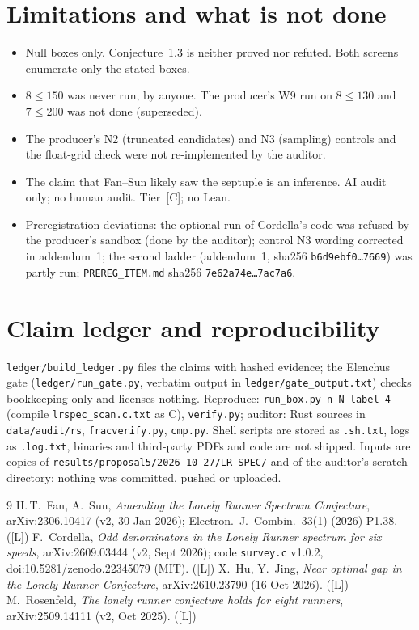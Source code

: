 \documentclass[10pt]{article}
\newcommand{\tier}[1]{\textsf{[#1]}}
\newcommand{\tL}{\tier{L}}
\newcommand{\tC}{\tier{C}}
\begin{document}
\section{Limitations and what is not done}\label{sec:lim}
\begin{itemize}\itemsep=1pt
\item Null boxes only. Conjecture~1.3 is neither proved nor refuted. Both screens enumerate only the stated boxes.
\item $8\le150$ was never run, by anyone. The producer's W9 run on $8\le130$ and $7\le200$ was not done (superseded).
\item The producer's N2 (truncated candidates) and N3 (sampling) controls and the float-grid check were not re-implemented by the auditor.
\item The claim that Fan--Sun likely saw the septuple is an inference. AI audit only; no human audit. Tier~\tC{}; no Lean.
\item Preregistration deviations: the optional run of Cordella's code was refused by the producer's sandbox (done by the auditor); control N3 wording corrected in addendum~1; the second ladder (addendum~1, sha256 \texttt{b6d9ebf0\dots7669}) was partly run; \texttt{PREREG\_ITEM.md} sha256 \texttt{7e62a74e\dots7ac7a6}.
\end{itemize}

\section{Claim ledger and reproducibility}\label{sec:ledger}
\texttt{ledger/build\_ledger.py} files the claims with hashed evidence; the Elenchus gate (\texttt{ledger/run\_gate.py}, verbatim output in \texttt{ledger/gate\_output.txt}) checks bookkeeping only and licenses nothing. Reproduce: \texttt{run\_box.py n N label 4} (compile \texttt{lrspec\_scan.c.txt} as C), \texttt{verify.py}; auditor: Rust sources in \texttt{data/audit/rs}, \texttt{fracverify.py}, \texttt{cmp.py}. Shell scripts are stored as \texttt{.sh.txt}, logs as \texttt{.log.txt}, binaries and third-party PDFs and code are not shipped. Inputs are copies of \texttt{results/proposal5/2026-10-27/LR-SPEC/} and of the auditor's scratch directory; nothing was committed, pushed or uploaded.

\begin{thebibliography}{9}\small
{} H.\,T.\ Fan, A.\ Sun, \emph{Amending the Lonely Runner Spectrum Conjecture}, arXiv:2306.10417 (v2, 30 Jan 2026); Electron.\ J.\ Combin.\ 33(1) (2026) P1.38. (\tL)
 F.\ Cordella, \emph{Odd denominators in the Lonely Runner spectrum for six speeds}, arXiv:2609.03444 (v2, Sept 2026); code \texttt{survey.c} v1.0.2, doi:10.5281/zenodo.22345079 (MIT). (\tL)
 X.\ Hu, Y.\ Jing, \emph{Near optimal gap in the Lonely Runner Conjecture}, arXiv:2610.23790 (16 Oct 2026). (\tL)
 M.\ Rosenfeld, \emph{The lonely runner conjecture holds for eight runners}, arXiv:2509.14111 (v2, Oct 2025). (\tL)
\end{thebibliography}
\end{document}
